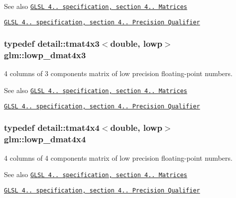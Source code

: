 \begin{DoxySeeAlso}{See also}
\href{http://www.opengl.org/registry/doc/GLSLangSpec.4.20.8.pdf}{\tt G\+L\+SL 4.. specification, section 4.. Matrices} 

\href{http://www.opengl.org/registry/doc/GLSLangSpec.4.20.8.pdf}{\tt G\+L\+SL 4.. specification, section 4.. Precision Qualifier} 
\end{DoxySeeAlso}
\subsubsection[{\texorpdfstring{lowp\+\_\+dmat4x3}{lowp_dmat4x3}}]{\setlength{\rightskip}{0pt plus 5cm}typedef detail\+::tmat4x3$<$double, lowp$>$ {\bf glm\+::lowp\+\_\+dmat4x3}}\hypertarget{group__core__precision_gabc1be51eb0cae7cd4b1d6483a954c35d}{}\label{group__core__precision_gabc1be51eb0cae7cd4b1d6483a954c35d}
4 columns of 3 components matrix of low precision floating-\/point numbers.

\begin{DoxySeeAlso}{See also}
\href{http://www.opengl.org/registry/doc/GLSLangSpec.4.20.8.pdf}{\tt G\+L\+SL 4.. specification, section 4.. Matrices} 

\href{http://www.opengl.org/registry/doc/GLSLangSpec.4.20.8.pdf}{\tt G\+L\+SL 4.. specification, section 4.. Precision Qualifier} 
\end{DoxySeeAlso}
\subsubsection[{\texorpdfstring{lowp\+\_\+dmat4x4}{lowp_dmat4x4}}]{\setlength{\rightskip}{0pt plus 5cm}typedef detail\+::tmat4x4$<$double, lowp$>$ {\bf glm\+::lowp\+\_\+dmat4x4}}\hypertarget{group__core__precision_gac762dec40f53114dfe6894499a2c9a79}{}\label{group__core__precision_gac762dec40f53114dfe6894499a2c9a79}
4 columns of 4 components matrix of low precision floating-\/point numbers.

\begin{DoxySeeAlso}{See also}
\href{http://www.opengl.org/registry/doc/GLSLangSpec.4.20.8.pdf}{\tt G\+L\+SL 4.. specification, section 4.. Matrices} 

\href{http://www.opengl.org/registry/doc/GLSLangSpec.4.20.8.pdf}{\tt G\+L\+SL 4.. specification, section 4.. Precision Qualifier} 
\end{DoxySeeAlso}
